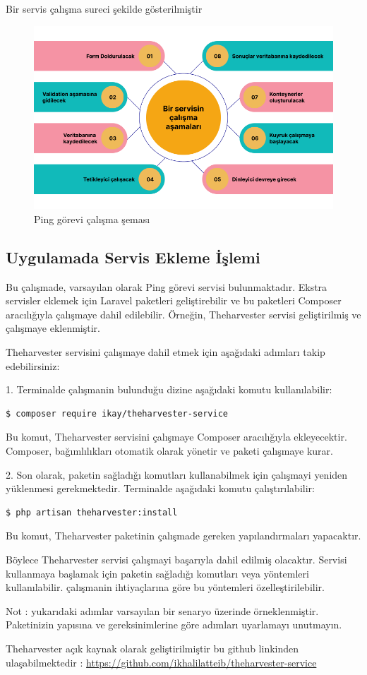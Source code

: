 Bir servis çalışma sureci şekilde gösterilmiştir
\begin{figure}[H]
	\centering
	\includegraphics[width=0.6\linewidth]{images/service.png}
	\caption{Ping görevi çalışma şeması}
	\label{fig:ping_task_diagram}
\end{figure}

\subsection{Uygulamada Servis Ekleme İşlemi}

Bu çalışmade, varsayılan olarak Ping görevi servisi bulunmaktadır. Ekstra servisler eklemek için Laravel paketleri geliştirebilir ve bu paketleri Composer aracılığıyla çalışmaye dahil edilebilir. Örneğin, Theharvester servisi geliştirilmiş ve çalışmaye eklenmiştir.

Theharvester servisini çalışmaye dahil etmek için aşağıdaki adımları takip edebilirsiniz:

1. Terminalde çalışmanin bulunduğu dizine aşağıdaki komutu kullanılabilir:
\begin{lstlisting}[language=bash]
	$ composer require ikay/theharvester-service
\end{lstlisting}

Bu komut, Theharvester servisini çalışmaye Composer aracılığıyla ekleyecektir. Composer, bağımlılıkları otomatik olarak yönetir ve paketi çalışmaye kurar.

2. Son olarak, paketin sağladığı komutları kullanabilmek için çalışmayi yeniden yüklenmesi gerekmektedir. Terminalde aşağıdaki komutu çalıştırılabilir:
\begin{lstlisting}[language=bash]
	$ php artisan theharvester:install
\end{lstlisting}

Bu komut, Theharvester paketinin çalışmade gereken yapılandırmaları yapacaktır.

Böylece Theharvester servisi çalışmayi başarıyla dahil edilmiş olacaktır. Servisi kullanmaya başlamak için paketin sağladığı komutları veya yöntemleri kullanılabilir. çalışmanin ihtiyaçlarına göre bu yöntemleri özelleştirilebilir.

Not : yukarıdaki adımlar varsayılan bir senaryo üzerinde örneklenmiştir. Paketinizin yapısına ve gereksinimlerine göre adımları uyarlamayı unutmayın.

Theharvester açık kaynak olarak geliştirilmiştir bu github linkinden ulaşabilmektedir : \href{https://github.com/ikhalilatteib/theharvester-service}{https://github.com/ikhalilatteib/theharvester-service}

